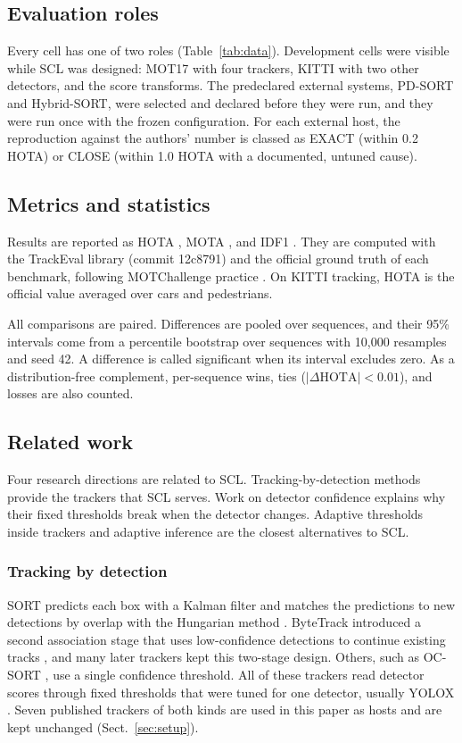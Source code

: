 \documentclass[pdflatex,sn-mathphys-num,iicol]{sn-jnl}
\newcommand{\scl}{SCL}
\begin{document}
\subsection{Evaluation roles}\label{sec:roles}
Every cell has one of two roles (Table~\ref{tab:data}). Development cells
were visible while \scl{} was designed: MOT17 with four trackers, KITTI
with two other detectors, and the score transforms. The predeclared external
systems, PD-SORT and Hybrid-SORT, were selected and declared before they were
run, and they were run once with the frozen configuration. For each external
host, the reproduction against the authors' number is classed as EXACT
(within 0.2 HOTA) or CLOSE (within 1.0 HOTA with a documented, untuned
cause).

\subsection{Metrics and statistics}\label{sec:metrics}
Results are reported as HOTA \cite{luiten2021hota}, MOTA
\cite{bernardin2008clear}, and IDF1 \cite{ristani2016idf1}. They are computed
with the TrackEval library (commit 12c8791) and the official ground truth of
each benchmark, following MOTChallenge practice
\cite{dendorfer2021motchallenge}. On KITTI tracking, HOTA is the official
value averaged over cars and pedestrians.

All comparisons are paired. Differences are pooled over sequences, and their
95\% intervals come from a percentile bootstrap over sequences
\cite{efron1993bootstrap} with 10,000 resamples and seed 42. A difference is
called significant when its interval excludes zero. As a distribution-free
complement, per-sequence wins, ties ($|\Delta\mathrm{HOTA}|<0.01$), and losses
are also counted.

\subsection{Related work}\label{sec:lit}

Four research directions are related to \scl{}. Tracking-by-detection methods provide the
trackers that \scl{} serves. Work on detector confidence explains why their
fixed thresholds break when the detector changes. Adaptive thresholds inside
trackers and adaptive inference are the closest alternatives to \scl{}.

\subsubsection{Tracking by detection}
SORT predicts each box with a Kalman filter and matches the predictions to new
detections by overlap with the Hungarian method \cite{bewley2016sort}.
ByteTrack introduced a second association stage that uses low-confidence
detections to continue existing tracks \cite{zhang2022bytetrack}, and many
later trackers kept this two-stage design. Others, such as OC-SORT
\cite{cao2023ocsort}, use a single confidence threshold. All of these
trackers read detector scores through fixed thresholds that were tuned for
one detector, usually YOLOX \cite{ge2021yolox}. Seven published trackers of
both kinds are used in this paper as hosts and are kept unchanged
(Sect.~\ref{sec:setup}).
\end{document}
